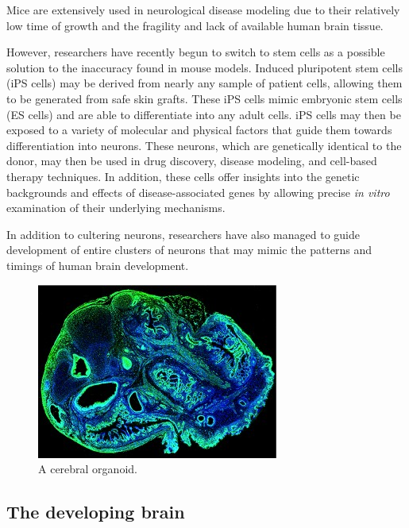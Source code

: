 \documentclass[12pt,oneside,onecolumn,a4paper]{article}
\begin{document}
Mice are extensively used in neurological disease modeling due to their relatively low time of growth and the fragility and lack of available human brain tissue. 

However, researchers have recently begun to switch to stem cells as a possible solution to the inaccuracy found in mouse models. Induced pluripotent stem cells
(iPS cells) may be derived from nearly any sample of patient cells, allowing them to be generated from safe skin grafts. These iPS cells mimic embryonic stem cells (ES cells) and are able to differentiate into any adult cells. iPS cells may then be exposed to a variety of molecular and physical factors that guide them towards differentiation into neurons. These neurons, which are genetically identical to the donor, may then be used in drug discovery, disease modeling, and cell-based therapy techniques. In addition, these cells offer insights into the genetic backgrounds and effects of disease-associated genes by allowing precise \textit{in vitro} examination of their underlying mechanisms. \citep{Imaizumi2014ModelingHN} 

In addition to cultering neurons, researchers have also managed to guide development of entire clusters of neurons that may mimic the patterns and timings of human brain development. 
\begin{figure}[h!]
\begin{center}
\includegraphics[width=0.8\columnwidth]{figures/cerebral_organoid/cerebral-organoid-for-Broad-web-300x218}
\caption{A cerebral organoid.\citep{nguyen_wang_nikolakopoulou_2015}%
}
\end{center}
\end{figure}

\subsection{The developing brain}\citep{Bakken_2015}
\end{document}
